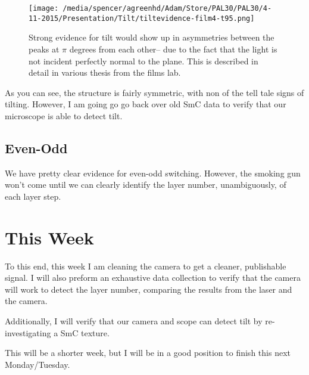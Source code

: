 \documentclass[reprint]{revtex4-1}
\begin{document}
\begin{figure}[H]
    \texttt{[image: /media/spencer/agreenhd/Adam/Store/PAL30/PAL30/4-11-2015/Presentation/Tilt/tiltevidence-film4-t95.png]}
    \caption{Strong evidence for tilt would show up in asymmetries between the
    peaks at $\pi$ degrees from each other-- due to the fact that the light is
not incident perfectly normal to the plane. This is described in detail in
various thesis from the films lab.\label{fig:tilt}}
\end{figure}

As you can see, the structure is fairly symmetric, with non of the
tell tale signs of tilting. However, I am going go go back over old SmC data to
verify that our microscope is able to detect tilt.
\subsection*{Even-Odd}
We have pretty clear evidence for even-odd switching.
However, the smoking gun won't come until we can clearly identify the layer
number, unambiguously, of each layer step.

\section*{This Week}

To this end, this week I am cleaning the camera to get a cleaner, publishable
signal. I will also preform an exhaustive data collection to verify that the
camera will work to detect the layer number, comparing the results from the laser and the camera.

Additionally, I will verify that our camera and scope can detect tilt by
re-investigating a SmC texture.

This will be a shorter week, but I will be in a good position to finish this
next Monday/Tuesday.
\end{document}
